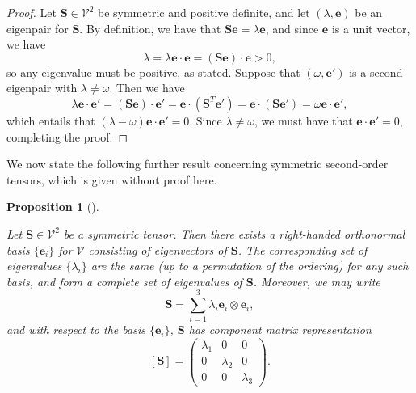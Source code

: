 \documentclass[
  letterpaper,
  DIV=11,
  numbers=noendperiod]{scrreprt}
\theoremstyle{plain}
\newtheorem{proposition}{Proposition}[chapter]
\theoremstyle{remark}
\begin{document}
\begin{proof}
Let \({\boldsymbol{S}}\in{\mathcal{V}}^2\) be symmetric and positive
definite, and let \((\lambda,{\boldsymbol{e}})\) be an eigenpair for
\({\boldsymbol{S}}\). By definition, we have that
\({\boldsymbol{S}}{\boldsymbol{e}}=\lambda{\boldsymbol{e}}\), and since
\({\boldsymbol{e}}\) is a unit vector, we have
\[\lambda = \lambda {\boldsymbol{e}}\cdot{\boldsymbol{e}}= ({\boldsymbol{S}}{\boldsymbol{e}})\cdot{\boldsymbol{e}}>0,\]
so any eigenvalue must be positive, as stated. Suppose that
\((\omega,{\boldsymbol{e}}')\) is a second eigenpair with
\(\lambda\neq \omega\). Then we have
\[\lambda {\boldsymbol{e}}\cdot {\boldsymbol{e}}' = ({\boldsymbol{S}}{\boldsymbol{e}})\cdot{\boldsymbol{e}}' = {\boldsymbol{e}}\cdot({\boldsymbol{S}}^T{\boldsymbol{e}}') = {\boldsymbol{e}}\cdot({\boldsymbol{S}}{\boldsymbol{e}}') = \omega{\boldsymbol{e}}\cdot{\boldsymbol{e}}',\]
which entails that
\((\lambda-\omega){\boldsymbol{e}}\cdot{\boldsymbol{e}}'=0\). Since
\(\lambda\neq\omega\), we must have that
\({\boldsymbol{e}}\cdot{\boldsymbol{e}}'=0\), completing the proof.
\end{proof}

We now state the following further result concerning symmetric
second-order tensors, which is given without proof here.

\begin{proposition}[]\protect\hypertarget{prp-spectraldecompositiontheorem}{}\label{prp-spectraldecompositiontheorem}

Let \({\boldsymbol{S}}\in{\mathcal{V}}^2\) be a symmetric tensor. Then
there exists a right-handed orthonormal basis \(\{{\boldsymbol{e}}_i\}\)
for \({\mathcal{V}}\) consisting of eigenvectors of
\({\boldsymbol{S}}\). The corresponding set of eigenvalues
\(\{\lambda_i\}\) are the same (up to a permutation of the ordering) for
any such basis, and form a complete set of eigenvalues of
\({\boldsymbol{S}}\). Moreover, we may write
\[{\boldsymbol{S}}= \sum_{i=1}^3\lambda_i{\boldsymbol{e}}_i\otimes{\boldsymbol{e}}_i,\]
and with respect to the basis \(\{{\boldsymbol{e}}_i\}\),
\({\boldsymbol{S}}\) has component matrix representation \[
[{\boldsymbol{S}}] = \left(
      \begin{array}{ccc}
        \lambda_1 & 0 & 0 \\
        0 & \lambda_2 & 0 \\
        0 & 0 & \lambda_3
      \end{array}\right).\]

\end{proposition}
\end{document}
